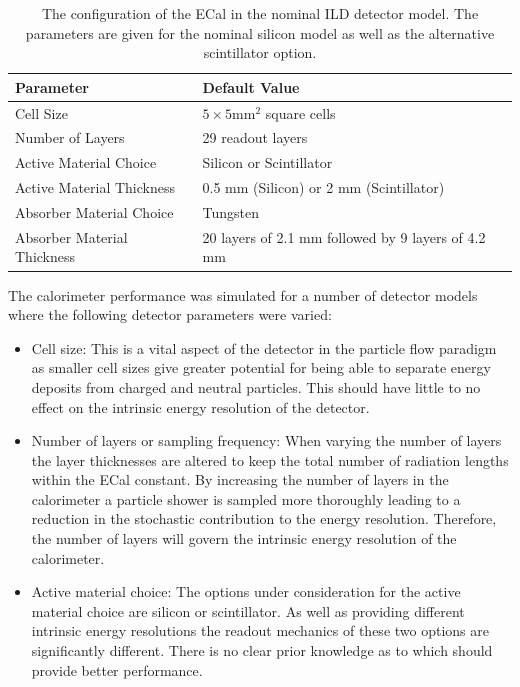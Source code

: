 \begin{table}[h!]
\centering
\begin{tabular}{ l l}
\hline
Parameter & Default Value \\
\hline
Cell Size & $5 \times 5 \text{mm}^{2}$ square cells \\
Number of Layers & 29 readout layers \\
Active Material Choice & Silicon or Scintillator  \\
Active Material Thickness & 0.5 mm (Silicon) or 2 mm (Scintillator)  \\
Absorber Material Choice & Tungsten \\
Absorber Material Thickness & 20 layers of 2.1 mm followed by 9 layers of 4.2 mm \\
\hline
\end{tabular}
\caption[The configuration of the ECal in the nominal ILD detector model.  The parameters are given for the nominal silicon model as well as the alternative scintillator option.]{The configuration of the ECal in the nominal ILD detector model.  The parameters are given for the nominal silicon model as well as the alternative scintillator option.}
\label{table:defaultildecal}
\end{table}

The calorimeter performance was simulated for a number of detector models where the following detector parameters were varied:
\begin{itemize}
\item Cell size:  This is a vital aspect of the detector in the particle flow paradigm as smaller cell sizes give greater potential for being able to separate energy deposits from charged and neutral particles.  This should have little to no effect on the intrinsic energy resolution of the detector.  
\item Number of layers or sampling frequency:  When varying the number of layers the layer thicknesses are altered to keep the total number of radiation lengths within the ECal constant.  By increasing the number of layers in the calorimeter a particle shower is sampled more thoroughly leading to a reduction in the stochastic contribution to the energy resolution.  Therefore, the number of layers will govern the intrinsic energy resolution of the calorimeter.
\item Active material choice:  The options under consideration for the active material choice are silicon or scintillator.  As well as providing different intrinsic energy resolutions the readout mechanics of these two options are significantly different.  There is no clear prior knowledge as to which should provide better performance. 
\end{itemize}

